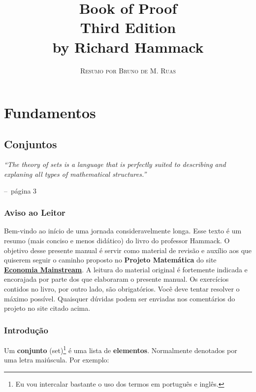 \documentclass[a4paper,11pt]{book}
\title{\Huge \textbf{Book of Proof} \\ 
\Large Third Edition \\
\huge by Richard Hammack}
\author{\textsc{Resumo por Bruno de M. Ruas}}
\makeatletter
\theoremstyle{definition}
\theoremstyle{break}
\newenvironment{chapquote}[2][2em]
  {\setlength{\@tempdima}{#1}%
   \def\chapquote@author{#2}%
   \parshape 1 \@tempdima \dimexpr\textwidth-2\@tempdima\relax%
   \itshape}
  {\par\normalfont\hfill--\ \chapquote@author\hspace*{\@tempdima}\par\bigskip}
\makeatother
\begin{document}
\frontmatter
\maketitle

\tableofcontents

\mainmatter

\part{Fundamentos}

\chapter{Conjuntos}

\begin{chapquote}{página 3}
	``The theory of sets is a language that is perfectly suited to describing and explaning all types of mathematical structures.''
\end{chapquote}


\section*{Aviso ao Leitor}
Bem-vindo ao início de uma jornada consideravelmente longa. Esse texto é um resumo (mais conciso e menos didático) do livro do professor Hammack. O objetivo desse presente manual é servir como material de revisão e auxílio aos que quiserem seguir o caminho proposto no \textbf{Projeto Matemática} do site \href{https://economiamainstream.com.br/artigo/matematica/}{\textbf{Economia Mainstream}}. A leitura do material original é fortemente indicada e encorajada por parte dos que elaboraram o presente manual. Os exercícios contidos no livro, por outro lado, são obrigatórios. Você deve tentar resolver o máximo possível. Quaisquer dúvidas podem ser enviadas nos comentários do projeto no site citado acima.

\section{Introdução}
Um \textbf{conjunto} (set)\footnote{Eu vou intercalar bastante o uso dos termos em português e inglês.} é uma lista de \textbf{elementos}. Normalmente denotados por uma letra maiúscula. Por exemplo:
\end{document}
